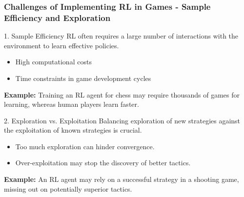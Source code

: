 \documentclass[aspectratio=169]{beamer}
\begin{document}
\begin{frame}[fragile]
    \frametitle{Challenges of Implementing RL in Games - Sample Efficiency and Exploration}
    \begin{block}{1. Sample Efficiency}
        RL often requires a large number of interactions with the environment to learn effective policies.
        \begin{itemize}
            \item High computational costs
            \item Time constraints in game development cycles
        \end{itemize}
        \textbf{Example:} Training an RL agent for chess may require thousands of games for learning, whereas human players learn faster.
    \end{block}
    
    \begin{block}{2. Exploration vs. Exploitation}
        Balancing exploration of new strategies against the exploitation of known strategies is crucial.
        \begin{itemize}
            \item Too much exploration can hinder convergence.
            \item Over-exploitation may stop the discovery of better tactics.
        \end{itemize}
        \textbf{Example:} An RL agent may rely on a successful strategy in a shooting game, missing out on potentially superior tactics.
    \end{block}
\end{frame}
\end{document}
